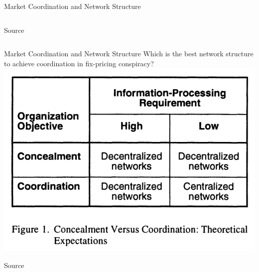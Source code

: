 \documentclass[notes, aspectratio=1610]{beamer}
\begin{document}
\begin{frame}{Market Coordination and Network Structure}
\begin{columns}
\begin{column}{0.5\textwidth}
			\raggedleft Source~\cite[][page 849]{baker_faulkner_1993}
		\end{column}


	\end{columns}
\end{frame}


\begin{frame}{Market Coordination and Network Structure}
	{Which is the best network structure to achieve coordination in fix-pricing conspiracy?}
	\centering
	\includegraphics[height=.8\textheight]{images/two_by_two.png}

	\raggedleft Source~\cite[][page 845]{baker_faulkner_1993}
\end{frame}
\end{document}
